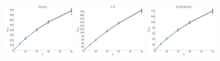 \documentclass[a4paper]{report}
\newcommand{\wratio}{0.19}
\begin{document}
\includegraphics[width=\wratio\textwidth]{maxcut/EMAIL/fs_email}\hfill
\includegraphics[width=\wratio\textwidth]{maxcut/E_R/fs_e_r}\hfill
\includegraphics[width=\wratio\textwidth]{maxcut/EUROROAD/fs_euroroad}\hfill
\end{document}
